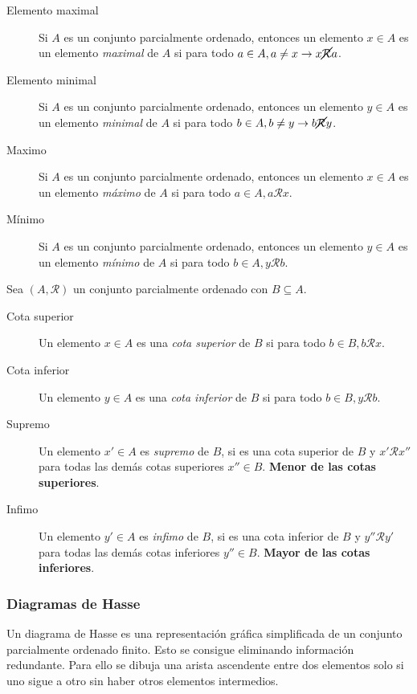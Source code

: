 \begin{description}
	\item[Elemento maximal] Si $A$ es un conjunto parcialmente ordenado, entonces un elemento $x \in A$ es un elemento \emph{maximal} de $A$ si para todo $a \in A, a \neq x \rightarrow x \cancel{\mathcal{R}} a$.
	\item[Elemento minimal] Si $A$ es un conjunto parcialmente ordenado, entonces un elemento $y \in A$ es un elemento \emph{minimal} de $A$ si para todo $b \in A, b \neq y \rightarrow b \cancel{\mathcal{R}} y$.
	\item[Maximo] Si $A$ es un conjunto parcialmente ordenado, entonces un elemento $x \in A$ es un elemento \emph{máximo} de $A$ si para todo $a \in A,a \mathcal{R} x$.
	\item[Mínimo] Si $A$ es un conjunto parcialmente ordenado, entonces un elemento $y \in A$ es un elemento \emph{mínimo} de $A$ si para todo $b \in A,y \mathcal{R} b$.
\end{description}

Sea $(A,\mathcal{R})$ un conjunto parcialmente ordenado con $B \subseteq A$.

\begin{description}
	\item[Cota superior] Un elemento $x \in A$ es una \emph{cota superior} de $B$ si para todo $b \in B,b \mathcal{R} x$.
	\item[Cota inferior] Un elemento $y \in A$ es una \emph{cota inferior} de $B$ si para todo $b \in B,y \mathcal{R} b$.
	\item[Supremo] Un elemento $x' \in A$ es \emph{supremo} de $B$, si es una cota superior de $B$ y $x'\mathcal{R}x''$ para todas las demás cotas superiores $x'' \in B$. \textbf{Menor de las cotas superiores}.
	\item[Infimo] Un elemento $y' \in A$ es \emph{infimo} de $B$, si es una cota inferior de $B$ y $y''\mathcal{R}y'$ para todas las demás cotas inferiores $y'' \in B$. \textbf{Mayor de las cotas inferiores}.
\end{description}

\subsubsection{Diagramas de Hasse}
Un diagrama de Hasse es una representación gráfica simplificada de un conjunto parcialmente ordenado finito.
Esto se consigue eliminando información redundante. Para ello se dibuja una arista ascendente entre dos elementos solo si uno sigue a otro sin haber otros elementos intermedios.\\

